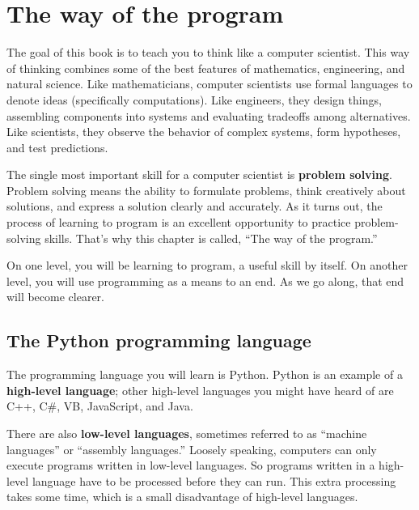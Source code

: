 \chapter{The way of the program}

The goal of this book is to teach you to think like a
computer scientist.  This way of thinking combines some of the best features
of mathematics, engineering, and natural science.  Like mathematicians,
computer scientists use formal languages to denote ideas (specifically
computations).  Like engineers, they design things, assembling components
into systems and evaluating tradeoffs among alternatives.  Like scientists,
they observe the behavior of complex systems, form hypotheses, and test
predictions.


The single most important skill for a computer scientist is {\bf
	problem solving}.  Problem solving means the ability to formulate
problems, think creatively about solutions, and express a solution clearly
and accurately.  As it turns out, the process of learning to program is an
excellent opportunity to practice problem-solving skills.  That's why
this chapter is called, ``The way of the program.''

On one level, you will be learning to program, a useful
skill by itself.  On another level, you will use programming as a means to
an end.  As we go along, that end will become clearer.


\section{The Python programming language}

The programming language you will learn is Python. Python is
an example of a {\bf high-level language}; other high-level languages
you might have heard of are C++, C\#, VB, JavaScript, and Java.

There are also {\bf low-level languages}, sometimes referred to as ``machine
languages'' or ``assembly languages.''  Loosely speaking, computers
can only execute programs written in low-level languages.  So
programs written in a high-level language have to be processed before
they can run.  This extra processing takes some time, which is a small
disadvantage of high-level languages.


